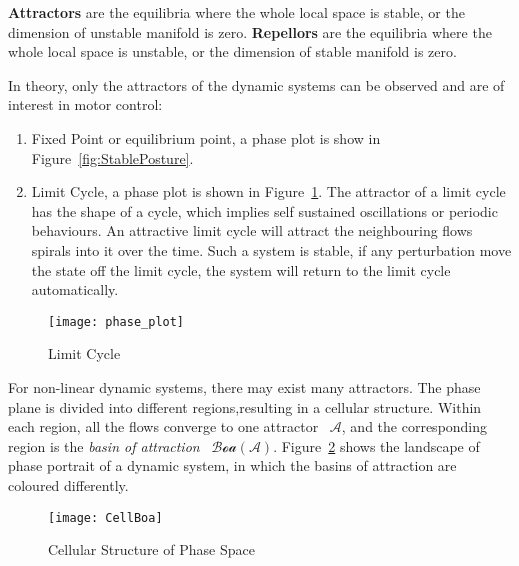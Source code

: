 \textbf{Attractors} are the equilibria where the whole local space is stable, or the dimension of unstable manifold is zero.
\textbf{Repellors} are the equilibria where the whole local space is unstable, or the dimension of stable manifold is zero.







In theory, only the attractors of the dynamic systems can be  observed  and are of interest in motor control:
\begin{enumerate}
 \item Fixed Point or equilibrium point, a phase plot  is show in Figure~\ref{fig:StablePosture}.
 \item Limit Cycle, a phase plot is shown in Figure~\ref{fig:ecycle}.
 The attractor of a limit cycle has the shape of a cycle, which implies self sustained oscillations or periodic behaviours.
 An attractive limit cycle will attract the neighbouring flows spirals into it over the time.
 Such  a system is stable, if any perturbation move the state off the limit cycle, the system will return to the limit cycle automatically.
 
\end{enumerate}

\begin{figure}
	\begin{center}
	\texttt{[image: phase\_plot]}
	\end{center}
	\caption{Limit Cycle}
	\label{fig:ecycle}
\end{figure}





For non-linear dynamic systems, there may exist many attractors.
The phase plane is divided into different regions,resulting in a cellular structure.
Within each region, all the flows converge to one attractor ~$\mathcal{A}$,
and the corresponding region is  the \emph{basin of attraction} ~$\mathcal{Boa}(\mathcal{A})$.
Figure~\ref{fig:manyboa} shows the landscape of phase portrait of a dynamic system, in which the basins of attraction are coloured differently.
\begin{figure}
\begin{center}
\texttt{[image: CellBoa]}
\end{center}
\caption{Cellular Structure of Phase Space}
\label{fig:manyboa}
\end{figure}




